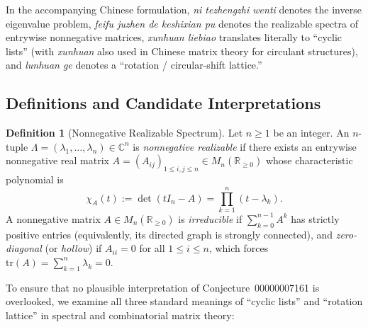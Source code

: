 \documentclass[11pt]{article}
\theoremstyle{definition}
\newtheorem{definition}[theorem]{Definition}
\theoremstyle{remark}
\begin{document}
In the accompanying Chinese formulation, \emph{ni tezhengzhi wenti} denotes the inverse
eigenvalue problem, \emph{feifu juzhen de keshixian pu} denotes the realizable spectra of
entrywise nonnegative matrices, \emph{xunhuan liebiao} translates literally to ``cyclic
lists'' (with \emph{xunhuan} also used in Chinese matrix theory for circulant structures),
and \emph{lunhuan ge} denotes a ``rotation / circular-shift lattice.''

\subsection{Definitions and Candidate Interpretations}

\begin{definition}[Nonnegative Realizable Spectrum]
Let $n \ge 1$ be an integer. An $n$-tuple $\Lambda = (\lambda_1, \dots, \lambda_n) \in
\mathbb{C}^n$ is \emph{nonnegative realizable} if there exists an entrywise nonnegative
real matrix $A = (A_{ij})_{1 \le i,j \le n} \in M_n(\mathbb{R}_{\ge 0})$ whose
characteristic polynomial is
\[
  \chi_A(t) := \det(t I_n - A) = \prod_{k=1}^n (t - \lambda_k).
\]
A nonnegative matrix $A \in M_n(\mathbb{R}_{\ge 0})$ is \emph{irreducible} if
$\sum_{k=0}^{n-1} A^k$ has strictly positive entries (equivalently, its directed graph is
strongly connected), and \emph{zero-diagonal} (or \emph{hollow}) if $A_{ii} = 0$ for all
$1 \le i \le n$, which forces $\mathrm{tr}(A) = \sum_{k=1}^n \lambda_k = 0$.
\end{definition}

To ensure that no plausible interpretation of Conjecture~00000007161 is overlooked, we
examine all three standard meanings of ``cyclic lists'' and ``rotation lattice'' in
spectral and combinatorial matrix theory:
\end{document}
